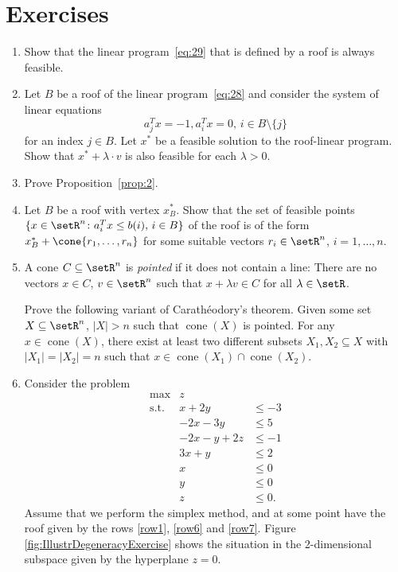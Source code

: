 \section*{Exercises}

\begin{enumerate}[1)]
\item \label{xitem:8}
  Show that the linear program~\eqref{eq:29} that is defined by a roof
  is always feasible. 
\item  Let $B$ be a roof of the linear program~\eqref{eq:28} and 
  consider the system of linear equations
  \begin{displaymath}
    a_{j}^Tx = -1, a_i^Tx=0, \, i \in B\setminus\{j\}
  \end{displaymath}
  for an index $j \in B$. 
  Let $x^*$ be a feasible solution to the roof-linear
  program. Show that  $x^* + \lambda \cdot v$ is also feasible for each 
  $\lambda>0$.  \label{xitem:9} 


\item Prove Proposition~\ref{prop:2}. \label{xitem:11}


\item 
  \label{sec:high-point-probl}
  Let $B$ be a roof with vertex $x^*_B$. Show that the 
   set of  feasible points $\{x \in \setR^n \colon a_i^Tx\leq b(i), \, i\in B\}$
   of the roof is of the form 
  $x_B^* + \cone\{r_1,\ldots,r_n\}$ for some suitable vectors $r_i \in
  \setR^n$, $i=1,\ldots,n$. 

\item A cone $C\subseteq \setR^n$ is \emph{pointed} if it does not contain a line: There are no vectors $x\in C$, $v\in \setR^n$ such that $x+\lambda v\in C$ for all $\lambda\in \setR$.

Prove the following variant of Carath\'eodory's theorem. 
Given some set  $X\subseteq \setR^n$, $|X|>n$ such that $\operatorname{cone}(X)$ is pointed.
For any $x \in \operatorname{cone}(X)$, there exist at least two
  different subsets $X_1,X_2\subseteq X$ with  $|X_1| = |X_2| = n$ such that $x\in \operatorname{cone}(X_1)\cap \operatorname{cone}(X_2)$.
 \label{xitem:12}
\item 
Consider the problem
\begin{eqnarray}
\label{row0}    \max & z & \\
\label{row1}    \text{s.t.} &  x+2y      & \leq -3 \\
\label{row2}        &  -2x - 3y  & \leq 5 \\
\label{row3}        & -2x -y  +2z& \leq -1 \\
\label{row4}	    &  3x+y  & \leq 2 \\
\label{row5}	    &  x  & \leq 0 \\
\label{row6}	    &  y  & \leq 0 \\
\label{row7}	    &  z  & \leq 0.
\end{eqnarray}
Assume that we perform the simplex method, and at some point have the roof given by the rows \eqref{row1}, \eqref{row6} and \eqref{row7}.
Figure \ref{fig:IllustrDegeneracyExercise} shows the situation in the 2-dimensional subspace given by the hyperplane $z=0$.


\end{enumerate}
